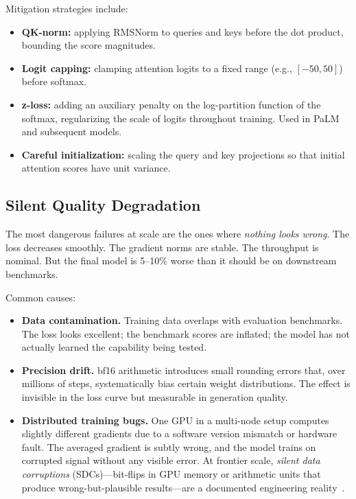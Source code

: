 Mitigation strategies include:
\begin{itemize}[nosep]
  \item \textbf{QK-norm:} applying RMSNorm to queries and keys before the dot product, bounding the score magnitudes.
  \item \textbf{Logit capping:} clamping attention logits to a fixed range (e.g., $[-50, 50]$) before softmax.
  \item \textbf{z-loss:} adding an auxiliary penalty on the log-partition function of the softmax, regularizing the scale of logits throughout training. Used in PaLM~\cite{chowdhery2023palm} and subsequent models.
  \item \textbf{Careful initialization:} scaling the query and key projections so that initial attention scores have unit variance.
\end{itemize}

\subsection{Silent Quality Degradation}

The most dangerous failures at scale are the ones where \emph{nothing looks wrong}. The loss decreases smoothly. The gradient norms are stable. The throughput is nominal. But the final model is 5--10\% worse than it should be on downstream benchmarks.

Common causes:
\begin{itemize}[nosep]
  \item \textbf{Data contamination.} Training data overlaps with evaluation benchmarks. The loss looks excellent; the benchmark scores are inflated; the model has not actually learned the capability being tested.
  \item \textbf{Precision drift.} bf16 arithmetic introduces small rounding errors that, over millions of steps, systematically bias certain weight distributions. The effect is invisible in the loss curve but measurable in generation quality.
  \item \textbf{Distributed training bugs.} One GPU in a multi-node setup computes slightly different gradients due to a software version mismatch or hardware fault. The averaged gradient is subtly wrong, and the model trains on corrupted signal without any visible error. At frontier scale, \emph{silent data corruptions} (SDCs)---bit-flips in GPU memory or arithmetic units that produce wrong-but-plausible results---are a documented engineering reality~\cite{dixit2021silent}.
\end{itemize}

